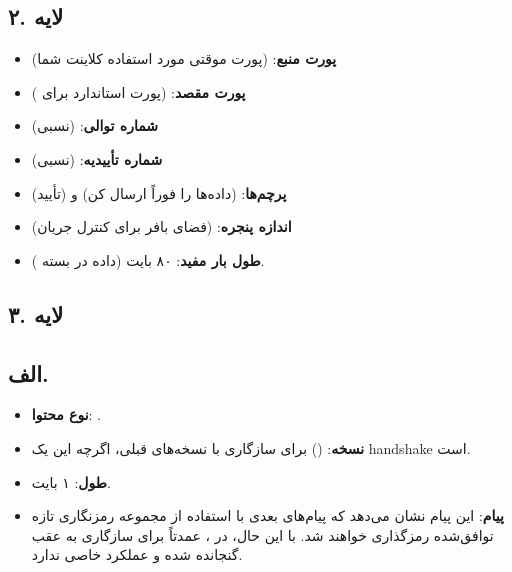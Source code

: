 \subsection*{۲. لایه }
\begin{itemize}
    \item \textbf{پورت منبع}:  (پورت موقتی مورد استفاده کلاینت شما)
    \item \textbf{پورت مقصد}:  (پورت استاندارد برای )
    \item \textbf{شماره توالی}:  (نسبی)
    \item \textbf{شماره تأییدیه}:  (نسبی)
    \item \textbf{پرچم‌ها}:  (داده‌ها را فوراً ارسال کن) و  (تأیید)
    \item \textbf{اندازه پنجره}:  (فضای بافر برای کنترل جریان)
    \item \textbf{طول بار مفید}: ۸۰ بایت (داده  در بسته ).
\end{itemize}


\subsection*{۳. لایه }
\subsection*{الف. }
\begin{itemize}
    \item \textbf{نوع محتوا}: .
    \item \textbf{نسخه}:  () برای سازگاری با نسخه‌های قبلی، اگرچه این یک handshake  است.
    \item \textbf{طول}: ۱ بایت.
    \item \textbf{پیام}: این پیام نشان می‌دهد که پیام‌های بعدی با استفاده از مجموعه رمزنگاری تازه توافق‌شده رمزگذاری خواهند شد. با این حال، در ،  عمدتاً برای سازگاری به عقب گنجانده شده و عملکرد خاصی ندارد.
\end{itemize}

